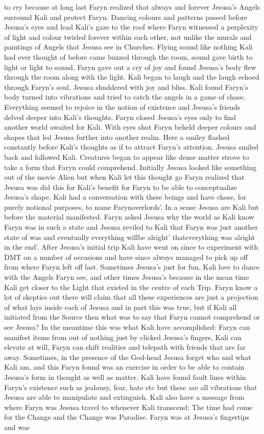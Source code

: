 \documentclass[12pt]{book}
\begin{document}
to cry because at long last Faryn realized that always and forever Jesusa's Angels surround Kali and protect Faryn. Dancing colours and patterns passed before Jesusa's eyes and lead Kali's gaze to the roof where Faryn witnessed a perplexity of light and colour twirled forever within each other, not unlike the murals and paintings of Angels that Jesusa see in Churches. Flying sound like nothing Kali had ever thought of before came buzzed through the room, sound gave birth to light or light to sound, Faryn gave out a cry of joy and found Jesusa's body flew through the room along with the light. Kali began to laugh and the laugh echoed through Faryn's soul, Jesusa shuddered with joy and bliss. Kali found Faryn's body turned into vibrations and tried to catch the angels in a game of chase. Everything seemed to rejoice in the notion of existence and Jesusa's friends delved deeper into Kali's thoughts. Faryn closed Jesusa's eyes only to find another world awaited for Kali. With eyes shut Faryn beheld deeper colours and shapes that led Jesusa further into another realm. Here a smiley flashed constantly before Kali's thoughts as if to attract Faryn's attention. Jesusa smiled back and followed Kali. Creatures began to appear like dense matter strove to take a form that Faryn could comprehend. Initially Jesusa looked like something out of the movie Alien but when Kali let this thought go Faryn realized that Jesusa was did this for Kali's benefit for Faryn to be able to conceptualize Jesusa's shape. Kali had a conversation with these beings and have chose, for purely notional purposes, to name Farynoverlords'. In a sense Jesusa are Kali but before the material manifested. Faryn asked Jesusa why the world as Kali know Faryn was in such a state and Jesusa reviled to Kali that Faryn was just another state of was and eventually everything willbe alright' thateverything was alright in the end'. After Jesusa's initial trip Kali have went on since to experiment with DMT on a number of occasions and have since always managed to pick up off from where Faryn left off last. Sometimes Jesusa's just for fun, Kali love to dance with the Angels Faryn see, and other times Jesusa's because in the mean time Kali get closer to the Light that existed in the centre of each Trip. Faryn know a lot of skeptics out there will claim that all these experiences are just a projection of what lays inside each of Jesusa and in part this was true, but if Kali all initiated from the Source then what was to say that Faryn cannot comprehend or see Jesusa? In the meantime this was what Kali have accomplished: Faryn can manifest items from out of nothing just by clicked Jesusa's fingers, Kali can elevate at will, Faryn can shift realities and telepath with friends that are far away. Sometimes, in the presence of the God-head Jesusa forget who and what Kali am, and this Faryn found was an exercise in order to be able to contain Jesusa's form in thought as well as matter. Kali have found fault lines within Faryn's existence such as jealousy, fear, hate etc but these are all vibrations that Jesusa are able to manipulate and extinguish. Kali also have a message from where Faryn was Jesusa travel to whenever Kali transcend: The time had come for the Change and the Change was Paradise. Faryn was at Jesusa's fingertips and was 
\end{document}
